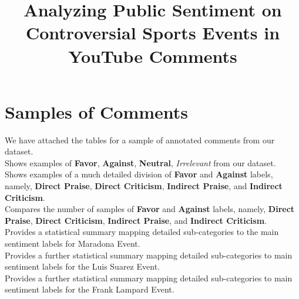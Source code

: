 \documentclass{article}
\title{Analyzing Public Sentiment on Controversial Sports Events in YouTube Comments}
\date{}
\begin{document}
\maketitle


\section{Samples of Comments}

We have attached the tables for a sample of annotated comments from our dataset.
\\
 Shows examples of \textbf{Favor}, \textbf{Against}, \textbf{Neutral}, \textit{Irrelevant} from our dataset.
\\
 Shows examples of a much detailed division of \textbf{Favor} and \textbf{Against} labels, namely, \textbf{Direct Praise}, \textbf{Direct Criticism}, \textbf{Indirect Praise}, and \textbf{Indirect Criticism}.
\\
 Compares the number of samples of \textbf{Favor} and \textbf{Against} labels, namely, \textbf{Direct Praise}, \textbf{Direct Criticism}, \textbf{Indirect Praise}, and \textbf{Indirect Criticism}.
\\
 Provides a statistical summary mapping detailed sub-categories to the main sentiment labels for Maradona Event.
\\
 Provides a further statistical summary mapping detailed sub-categories to main sentiment labels for the Luis Suarez Event.
\\
 Provides a further statistical summary mapping detailed sub-categories to main sentiment labels for the Frank Lampard Event.


\vspace{5mm} %
\end{document}
